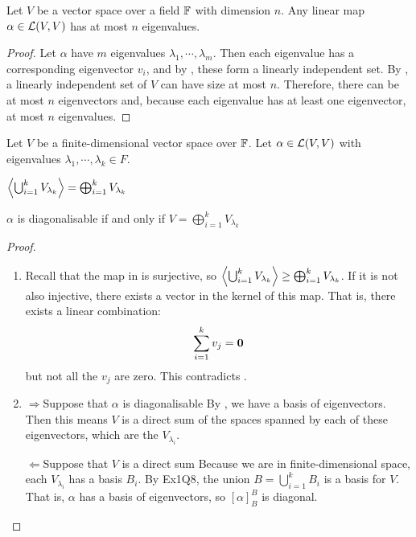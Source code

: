 \documentclass[../Main.tex]{subfiles}
\begin{document}
\begin{corollary}
    Let $V$ be a vector space over a field $\mathbb{F}$ with dimension $n$. Any linear map $\alpha \in \mathcal{L}(V, V)$ has at most $n$ eigenvalues.
    \label{corFinitelyManyEVals}
\end{corollary}
\begin{proof}
    Let $\alpha$ have $m$ eigenvalues $\lambda_1, \cdots, \lambda_m$. Then each eigenvalue has a corresponding eigenvector $v_i$, and by , these form a linearly independent set. By , a linearly independent set of $V$ can have size at most $n$. Therefore, there can be at most $n$ eigenvectors and, because each eigenvalue has at least one eigenvector, at most $n$ eigenvalues.
\end{proof}
\begin{propositions}{
        Let $V$ be a finite-dimensional vector space over $\mathbb{F}$. Let $\alpha \in \mathcal{L}(V, V)$ with eigenvalues $\lambda_1, \cdots, \lambda_k \in F$.
        \label{propsEigenspaces}
    }
    \item $\left\langle \bigcup_{i = 1}^k V_{\lambda_k} \right\rangle = \bigoplus_{i = 1}^k V_{\lambda_k}$ \label{propSpanESpaces}
    \item $\alpha$ is diagonalisable if and only if $V = \bigoplus_{i = 1}^k V_{\lambda_k}$ \label{propESpaceWholeSpace}
\end{propositions}
\begin{proof}
    \begin{enumerate}
        \item Recall that the map in  is surjective, so $\left\langle \bigcup_{i = 1}^k V_{\lambda_k} \right\rangle \geq \bigoplus_{i = 1}^k V_{\lambda_k}$. If it is not also injective, there exists a vector in the kernel of this map. That is, there exists a linear combination:
            \begin{equation*}
                \sum_{i=1}^{k} v_j = \boldsymbol{0}
            \end{equation*}
            but not all the $v_j$ are zero. This contradicts .
        \item
            \begin{proofdirection}{$\Rightarrow$}{Suppose that $\alpha$ is diagonalisable}
                By , we have a basis of eigenvectors. Then this means $V$ is a direct sum of the spaces spanned by each of these eigenvectors, which are the $V_{\lambda_i}$.
            \end{proofdirection}
            \begin{proofdirection}{$\Leftarrow$}{Suppose that $V$ is a direct sum}
                Because we are in finite-dimensional space, each $V_{\lambda_i}$ has a basis $B_i$. By Ex1Q8, the union $B = \bigcup_{i = 1}^k B_i$ is a basis for $V$. That is, $\alpha$ has a basis of eigenvectors, so $[\alpha]_B^B$ is diagonal.
            \end{proofdirection}
    \end{enumerate}
\end{proof}
\end{document}
